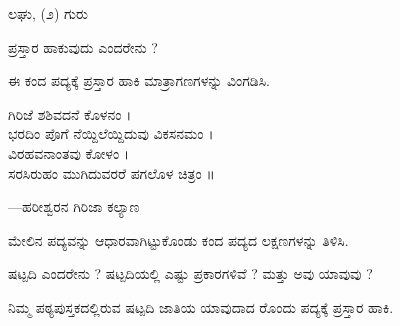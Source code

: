 
\vspace{2.5pt plus 3pt minus 0.5pt}\noindent\hspace*{1.2em}\hspace{0.55em}ಲಘು, (೨) ಗುರು\par

\vspace{2.5pt plus 3pt minus 0.5pt}\noindent\hspace*{1.2em}\hspace{0.55em}ಪ್ರಸ್ತಾರ ಹಾಕುವುದು ಎಂದರೇನು ?\par

\vspace{2.5pt plus 3pt minus 0.5pt}\noindent\hspace*{1.2em}\hspace{0.55em}ಈ ಕಂದ ಪದ್ಯಕ್ಕೆ ಪ್ರಸ್ತಾರ ಹಾಕಿ ಮಾತ್ರಾಗಣಗಳನ್ನು ವಿಂಗಡಿಸಿ.\par

\begin{kbvverse}
\noindent ಗಿರಿಜೆ ಶಶಿವದನೆ ಕೊಳನಂ । \\
\noindent ಭರದಿಂ ಪೊಗೆ ನೆಯ್ದಿಲೆಯ್ದಿದುವು ವಿಕಸನಮಂ । \\
\noindent ವಿರಹವನಾಂತವು ಕೋಳಂ । \\
\noindent ಸರಸಿರುಹಂ ಮುಗಿದುವರರೆ ಪಗಲೊಳ ಚಿತ್ರಂ ॥
\end{kbvverse}

\noindent\hfill{\fontsize{9.5pt}{12.5pt}\selectfont\color{kbvgrey}—ಹರೀಶ್ವರನ ಗಿರಿಜಾ ಕಲ್ಯಾಣ}\par\vspace{3pt plus 2pt}

\vspace{2.5pt plus 3pt minus 0.5pt}\noindent\hspace*{1.2em}\hspace{0.55em}ಮೇಲಿನ ಪದ್ಯವನ್ನು ಆಧಾರವಾಗಿಟ್ಟುಕೊಂಡು ಕಂದ ಪದ್ಯದ ಲಕ್ಷಣಗಳನ್ನು ತಿಳಿಸಿ.\par

\vspace{2.5pt plus 3pt minus 0.5pt}\noindent\hspace*{1.2em}\hspace{0.55em}ಷಟ್ಪದಿ ಎಂದರೇನು ? ಷಟ್ಪದಿಯಲ್ಲಿ ಎಷ್ಟು ಪ್ರಕಾರಗಳಿವೆ ? ಮತ್ತು ಅವು ಯಾವುವು ?\par

\vspace{2.5pt plus 3pt minus 0.5pt}\noindent\hspace*{1.2em}\hspace{0.55em}ನಿಮ್ಮ ಪಠ್ಯಪುಸ್ತಕದಲ್ಲಿರುವ ಷಟ್ಪದಿ ಜಾತಿಯ ಯಾವುದಾದ ರೊಂದು ಪದ್ಯಕ್ಕೆ ಪ್ರಸ್ತಾರ ಹಾಕಿ.\par

